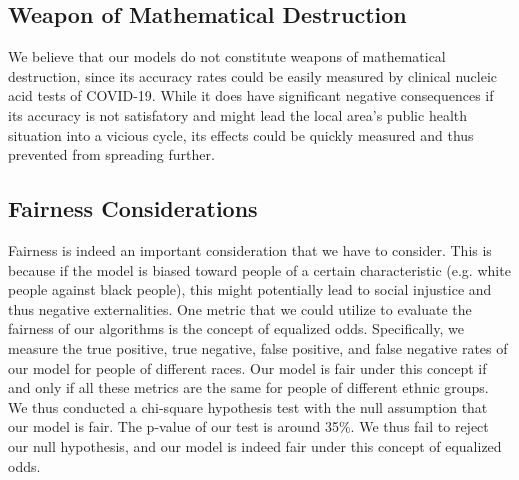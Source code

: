 \documentclass[a4paper, 11pt]{article}
\begin{document}
\subsection*{Weapon of Mathematical Destruction}
We believe that our models do not constitute weapons of mathematical destruction, since its accuracy rates could be easily measured by clinical nucleic acid tests of COVID-19. While it does have significant negative consequences if its accuracy is not satisfatory and might lead the local area's public health situation into a vicious cycle, its effects could be quickly measured and thus prevented from spreading further.

\subsection*{Fairness Considerations}
Fairness is indeed an important consideration that we have to consider. This is because if the model is biased toward people of a certain characteristic (e.g. white people against black people), this might potentially lead to social injustice and thus negative externalities. One metric that we could utilize to evaluate the fairness of our algorithms is the concept of equalized odds. Specifically, we measure the true positive, true negative, false positive, and false negative rates of our model for people of different races. Our model is fair under this concept if and only if all these metrics are the same for people of different ethnic groups. We thus conducted a chi-square hypothesis test with the null assumption that our model is fair. The p-value of our test is around 35\%. We thus fail to reject our null hypothesis, and our model is indeed fair under this concept of equalized odds.
\end{document}
